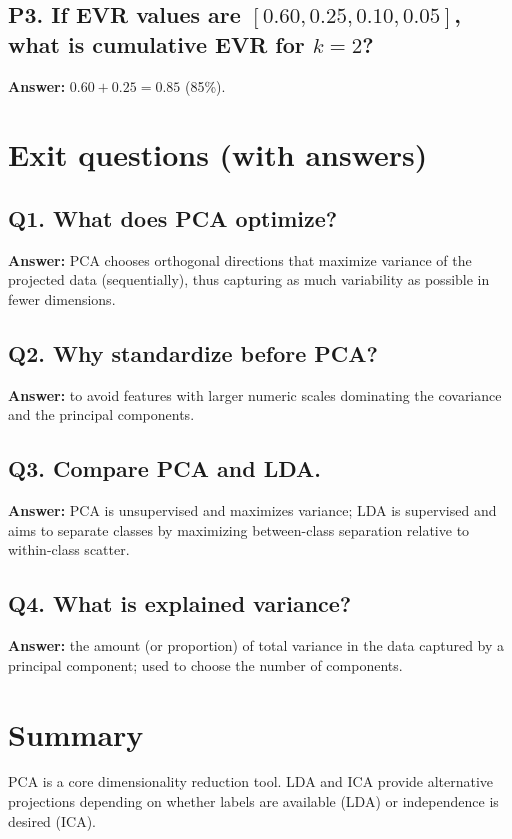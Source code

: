 \documentclass[11pt]{article}
\begin{document}
\subsection*{P3. If EVR values are $[0.60, 0.25, 0.10, 0.05]$, what is cumulative EVR for $k=2$?}
\textbf{Answer:} $0.60 + 0.25 = 0.85$ (85\%).

\section{Exit questions (with answers)}

\subsection*{Q1. What does PCA optimize?}
\textbf{Answer:} PCA chooses orthogonal directions that maximize variance of the projected data (sequentially), thus capturing as much variability as possible in fewer dimensions.

\subsection*{Q2. Why standardize before PCA?}
\textbf{Answer:} to avoid features with larger numeric scales dominating the covariance and the principal components.

\subsection*{Q3. Compare PCA and LDA.}
\textbf{Answer:} PCA is unsupervised and maximizes variance; LDA is supervised and aims to separate classes by maximizing between-class separation relative to within-class scatter.

\subsection*{Q4. What is explained variance?}
\textbf{Answer:} the amount (or proportion) of total variance in the data captured by a principal component; used to choose the number of components.

\section{Summary}
PCA is a core dimensionality reduction tool. LDA and ICA provide alternative projections depending on whether labels are available (LDA) or independence is desired (ICA).
\notesources{\AIMLUnitIIISources}
\end{document}
